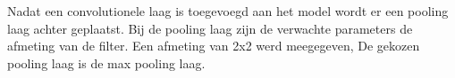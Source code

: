 Nadat een convolutionele laag is toegevoegd aan het model wordt er een pooling laag achter geplaatst.
Bij de pooling laag zijn de verwachte parameters de afmeting van de filter.
Een afmeting van 2x2 werd meegegeven, De gekozen pooling laag is de max pooling laag.

 















